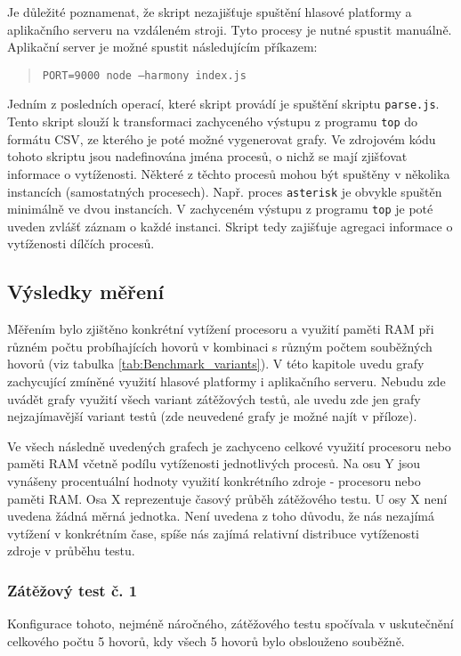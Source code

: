 \documentclass[ing,male,java,dept460]{diploma}						%
\begin{document}
Je důležité poznamenat, že skript nezajišťuje spuštění hlasové platformy a aplikačního serveru na vzdáleném stroji. Tyto procesy je nutné spustit manuálně. Aplikační server je možné spustit následujícím příkazem:

\begin{quote}
	\texttt{PORT=9000 node --harmony index.js}
\end{quote}

Jedním z posledních operací, které skript provádí je spuštění skriptu \texttt{parse.js}. Tento skript slouží k transformaci zachyceného výstupu z programu \texttt{top} do formátu CSV, ze kterého je poté možné vygenerovat grafy. Ve zdrojovém kódu tohoto skriptu jsou nadefinována jména procesů, o nichž se mají zjišťovat informace o vytíženosti. Některé z těchto procesů mohou být spuštěny v několika instancích (samostatných procesech). Např. proces \texttt{asterisk} je obvykle spuštěn minimálně ve dvou instancích. V zachyceném výstupu z programu \texttt{top} je poté uveden zvlášť záznam o každé instanci. Skript tedy zajišťuje agregaci informace o vytíženosti dílčích procesů.

\subsection{Výsledky měření}
\label{sec:Benchmark_results}
Měřením bylo zjištěno konkrétní vytížení procesoru a využití paměti RAM při různém počtu probíhajících hovorů v kombinaci s různým počtem souběžných hovorů (viz tabulka \ref{tab:Benchmark_variants}). V této kapitole uvedu grafy zachycující zmíněné využití hlasové platformy i aplikačního serveru. Nebudu zde uvádět grafy využití všech variant zátěžových testů, ale uvedu zde jen grafy nejzajímavější variant testů (zde neuvedené grafy je možné najít v příloze).

Ve všech následně uvedených grafech je zachyceno celkové využití procesoru nebo paměti RAM včetně podílu vytíženosti jednotlivých procesů. Na osu Y jsou vynášeny procentuální hodnoty využití konkrétního zdroje - procesoru nebo paměti RAM. Osa X reprezentuje časový průběh zátěžového testu. U osy X není uvedena žádná měrná jednotka. Není uvedena z toho důvodu, že nás nezajímá vytížení v konkrétním čase, spíše nás zajímá relativní distribuce vytíženosti zdroje v průběhu testu.

\subsubsection{Zátěžový test č. 1}
Konfigurace tohoto, nejméně náročného, zátěžového testu spočívala v uskutečnění celkového počtu 5 hovorů, kdy všech 5 hovorů bylo obslouženo souběžně.
\end{document}
